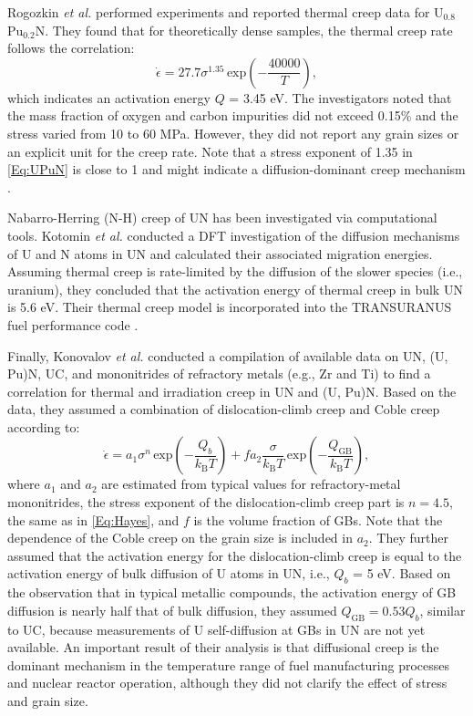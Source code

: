\documentclass[preprint,12pt,sort&compress]{elsarticle}
\newcommand{\?}{\stackrel{?}{=}}
\begin{document}
Rogozkin \textit{et al.} \cite{Rogozkin2003} performed experiments and reported thermal creep data for U$_{0.8}$Pu$_{0.2}$N. They found that for theoretically dense samples, the thermal creep rate follows the correlation:
\begin{equation}
\Dot{\epsilon} = 27.7 \sigma^{1.35} \, \mathrm{exp} \! \left( - \frac{40000}{T} \right),
\label{Eq:UPuN}
\end{equation}
which indicates an activation energy $Q$ = 3.45 eV. The investigators noted that the mass fraction of oxygen and carbon impurities did not exceed 0.15\% and the stress varied from 10 to 60 MPa. However, they did not report any grain sizes or an explicit unit for the creep rate. Note that a stress exponent of 1.35 in \cref{Eq:UPuN} is close to 1 and might indicate a diffusion-dominant creep mechanism \cite{Rogozkin2003, Meyers2009}.

Nabarro-Herring (N-H) creep of UN has been investigated via computational tools. Kotomin \textit{et al.} \cite{Kotomin2009} conducted a DFT investigation of the diffusion mechanisms of U and N atoms in UN and calculated their associated migration energies. Assuming thermal creep is rate-limited by the diffusion of the slower species (i.e., uranium), they concluded that the activation energy of thermal creep in bulk UN is 5.6 eV. Their thermal creep model is incorporated into the TRANSURANUS fuel performance code \cite{Kotomin2009}.

Finally, Konovalov \textit{et al.} \cite{Konovalov2016} conducted a compilation of available data on UN, (U, Pu)N, UC, and mononitrides of refractory metals (e.g., Zr and Ti) to find a correlation for thermal and irradiation creep in UN and (U, Pu)N. Based on the data, they assumed a combination of dislocation-climb creep and Coble creep according to:
\begin{equation}
\Dot{\epsilon} = a_1 \sigma^n \, \mathrm{exp} \! \left( - \frac{Q_b}{k_\mathrm{B} T} \right) + f a_2 \frac{\sigma}{k_\mathrm{B} T} \, \mathrm{exp} \! \left( - \frac{ Q_\mathrm{GB}}{k_\mathrm{B} T} \right),
\end{equation}
where $a_1$ and $a_2$ are estimated from typical values for refractory-metal mononitrides, the stress exponent of the dislocation-climb creep part is $n=4.5$, the same as in \cref{Eq:Hayes}, and $f$ is the volume fraction of GBs. Note that the dependence of the Coble creep on the grain size is included in $a_2$. They further assumed that the activation energy for the dislocation-climb creep is equal to the activation energy of bulk diffusion of U atoms in UN, i.e., $Q_b$ = 5 eV. Based on the observation that in typical metallic compounds, the activation energy of GB diffusion is nearly half that of bulk diffusion, they assumed $Q_\mathrm{GB} = 0.53 Q_b$, similar to UC, because measurements of U self-diffusion at GBs in UN are not yet available. An important result of their analysis is that diffusional creep is the dominant mechanism in the temperature range of fuel manufacturing processes and nuclear reactor operation, although they did not clarify the effect of stress and grain size.
\end{document}
